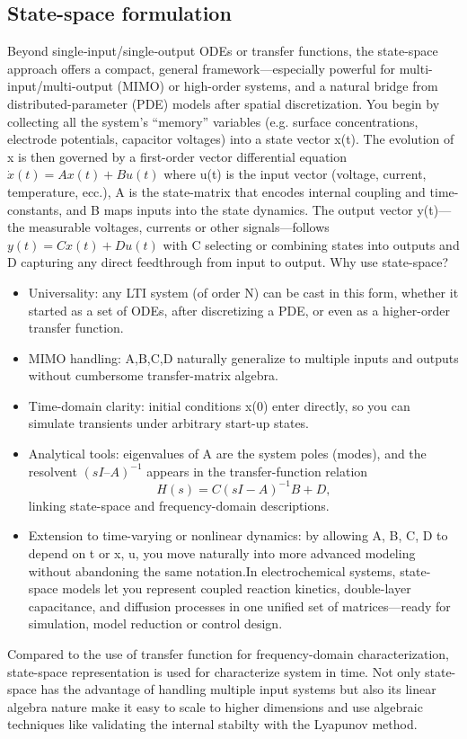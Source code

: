 \subsection{State-space formulation}
Beyond single‐input/single‐output ODEs or transfer functions, the state-space approach offers a compact, general framework—especially powerful for multi-input/multi-output (MIMO) or high-order systems, and a natural bridge from distributed-parameter (PDE) models after spatial discretization. You begin by collecting all the system’s “memory” variables (e.g. surface concentrations, electrode potentials, capacitor voltages) into a state vector x(t). The evolution of x is then governed by a first-order vector differential equation 
$\dot{x}(t) = Ax(t) + B u(t)$
where u(t) is the input vector (voltage, current, temperature, ecc.), A is the state-matrix that encodes internal coupling and time-constants, and B maps inputs into the state dynamics. The output vector y(t)—the measurable voltages, currents or other signals—follows 
$y(t)=Cx(t)+Du(t)$
with C selecting or combining states into outputs and D capturing any direct feedthrough from input to output. Why use state-space?
\begin{itemize}
    \item  Universality: any LTI system (of order N) can be cast in this form, whether it started as a set of ODEs, after discretizing a PDE, or even as a higher-order transfer function.
    \item  MIMO handling: A,B,C,D naturally generalize to multiple inputs and outputs without cumbersome transfer-matrix algebra.
    \item Time-domain clarity: initial conditions x(0) enter directly, so you can simulate transients under arbitrary start-up states.
    \item Analytical tools: eigenvalues of A are the system poles (modes), and the resolvent $(sI–A)^{-1}$ appears in the transfer-function relation
    $$
    H(s) = C (sI-A)^{-1}B+D,
    $$
    linking state-space and frequency-domain descriptions.
    \item Extension to time-varying or nonlinear dynamics: by allowing A, B, C, D to depend on t or x, u, you move naturally into more advanced modeling without abandoning the same notation.In electrochemical systems, state-space models let you represent coupled reaction kinetics, double-layer capacitance, and diffusion processes in one unified set of matrices—ready for simulation, model reduction or control design. 
\end{itemize}
Compared to the use of transfer function for frequency-domain characterization, state-space representation is used for characterize system in time. Not only state-space has the advantage of handling multiple input systems but also its linear algebra nature make it easy to scale to higher dimensions and use algebraic techniques like validating the internal stabilty with the Lyapunov method. \\

